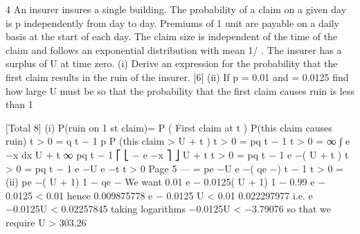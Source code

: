 \documentclass[a4paper,12pt]{article}
\begin{document}
 



4
An insurer insures a single building. The probability of a claim on a given day is p
independently from day to day. Premiums of 1 unit are payable on a daily basis at the
start of each day. The claim size is independent of the time of the claim and follows
an exponential distribution with mean 1/ . The insurer has a surplus of U at time
zero.
(i) Derive an expression for the probability that the first claim results in the ruin
of the insurer.
[6]
(ii) If p = 0.01 and = 0.0125 find how large U must be so that the probability
that the first claim causes ruin is less than 1%

[Total 8]
(i)
P(ruin on 1 st claim)=
\sum  P ( First claim at t ) \times  P(this claim causes ruin)
t > 0
=
\sum  q t − 1 \times  p \times  P (this claim > U + t )
t > 0
=
\sum  pq t − 1 \times 
t > 0
=
∞
∫
\lambda  e −\lambda  x dx
U + t
∞
\sum  pq t − 1 \times  ⎡ ⎣ − e −\lambda  x ⎤ ⎦ U + t
t > 0
=
\sum  pq t − 1 e −\lambda  ( U + t )
t > 0
=
\sum  pq t − 1 e −\lambda  U e −\lambda  t
t > 0
Page 5 — %
= pe −\lambda  U e −\lambda  \sum  ( qe −\lambda  ) t − 1
t > 0
=
(ii)
pe −\lambda  ( U + 1)
1 − qe −\lambda 
We want
0.01 \times  e − 0.0125( U + 1)
1 − 0.99 \times  e − 0.0125
< 0.01
hence
0.009875778 \times  e − 0.0125 U
< 0.01
0.022297977
i.e.
e −0.0125U < 0.02257845
taking logarithms
−0.0125U < −3.79076
so that we require
U > 303.26
\end{document}
